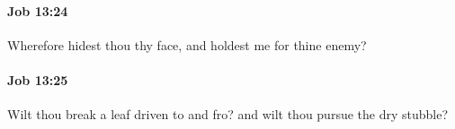 		\paragraph{Job 13:24} %
			\label{JOB-13-24}

			Wherefore hidest thou thy face, and holdest me for thine enemy?


		\paragraph{Job 13:25} %
			\label{JOB-13-25}

			Wilt thou break a leaf driven to and fro? and wilt thou pursue the dry stubble?


